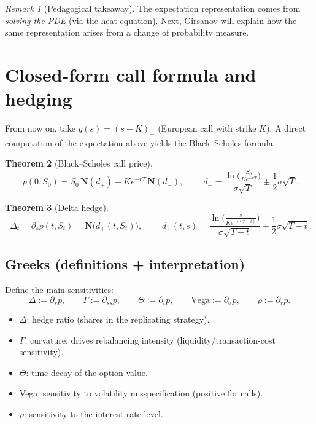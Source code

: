 \documentclass[11pt]{article}
\newtheorem{theorem}{Theorem}[section]
\theoremstyle{definition}
\theoremstyle{remark}
\newtheorem{remark}[theorem]{Remark}
\newcommand{\1}{\mathbf{1}}
\theoremstyle{definition}
\begin{document}
\begin{remark}[Pedagogical takeaway]
The expectation representation comes from \emph{solving the PDE} (via the heat equation).
Next, Girsanov will explain how the same representation arises from a change of probability measure.
\end{remark}

\section*{Closed-form call formula and hedging}

From now on, take $g(s)=(s-K)_+$ (European call with strike $K$).
A direct computation of the expectation above yields the Black--Scholes formula.

\begin{theorem}[Black--Scholes call price]
\[
\boxed{
\;
p(0,S_0)=S_0\,\mathbf N(d_+)-K e^{-rT}\,\mathbf N(d_-),
\;}
\qquad
d_\pm
=
\frac{\ln\!\big(\frac{S_0}{K e^{-rT}}\big)}{\sigma\sqrt{T}}
\pm \frac12\sigma\sqrt{T}.
\]
\end{theorem}

\begin{theorem}[Delta hedge]
\[
\boxed{
\;
\Delta_t=\partial_s p(t,S_t)=\mathbf N\!\big(d_+(t,S_t)\big),
\;}
\qquad
d_+(t,s)
=
\frac{\ln\!\big(\frac{s}{K e^{-r(T-t)}}\big)}{\sigma\sqrt{T-t}}
+\frac12\sigma\sqrt{T-t}.
\]
\end{theorem}

\subsection*{Greeks (definitions + interpretation)}
Define the main sensitivities:
\[
\Delta := \partial_s p,\qquad
\Gamma := \partial_{ss}p,\qquad
\Theta := \partial_t p,\qquad
\text{Vega}:=\partial_\sigma p,\qquad
\rho:=\partial_r p.
\]
\begin{itemize}[leftmargin=1.6em, itemsep=0.2em]
\item $\Delta$: hedge ratio (shares in the replicating strategy).
\item $\Gamma$: curvature; drives rebalancing intensity (liquidity/transaction-cost sensitivity).
\item $\Theta$: time decay of the option value.
\item Vega: sensitivity to volatility misspecification (positive for calls).
\item $\rho$: sensitivity to the interest rate level.
\end{itemize}
\end{document}
